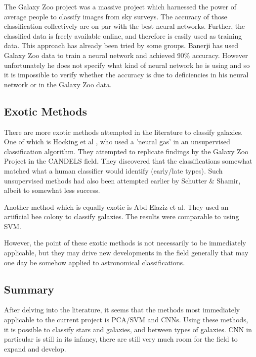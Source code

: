 \documentclass[a4paper,11pt]{article}
\begin{document}
The Galaxy Zoo project was a massive project which harnessed the power of average people to classify images from sky surveys. The accuracy of those classification collectively are on par with the best neural networks. Further, the classified data is freely available online, and therefore is easily used as training data. This approach has already been tried by some groups. Banerji has used Galaxy Zoo data to train a neural network and achieved 90\% accuracy. \cite{banerji_2010_galaxy} However unfortunately he does not specify what kind of neural network he is using and so it is impossible to verify whether the accuracy is due to deficiencies in his neural network or in the Galaxy Zoo data. 

\subsection{Exotic Methods}
There are more exotic methods attempted in the literature to classify galaxies. One of which is Hocking et al \cite{hocking_2017_an} , who used a 'neural gas' in an unsupervised classification algorithm. They attempted to replicate findings by the Galaxy Zoo Project in the CANDELS field. They discovered that the classifications somewhat matched what a human classifier would identify (early/late types). Such unsupervised methods had also been attempted earlier by Schutter \& Shamir, \cite{banerji_2010_galaxy} albeit to somewhat less success. 

Another method which is equally exotic is Abd Elaziz et al. They used an artificial bee colony to classify galaxies. \cite{abdelaziz_2018_galaxies} The results were comparable to using SVM. 

However, the point of these exotic methods is not necessarily to be immediately applicable, but they may drive new developments in the field generally that may one day be somehow applied to astronomical classifications.

\subsection{Summary}
After delving into the literature, it seems that the methods most immediately applicable to the current project is PCA/SVM and CNNs. Using these methods, it is possible to classify stars and galaxies, and between types of galaxies. CNN in particular is still in its infancy, there are still very much room for the field to expand and develop. 

\newpage
\label{sec:theory}
\end{document}
